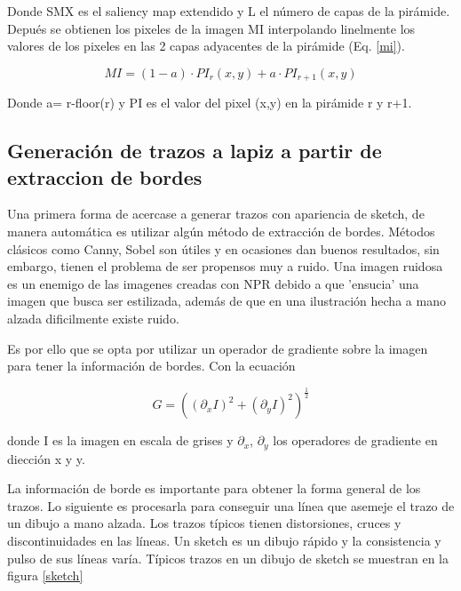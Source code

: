 \documentclass[letterpaper, 10 pt, conference]{ieeeconf}  %
\begin{document}
Donde SMX es el saliency map extendido y L el número de capas de la pirámide. Depués se obtienen los pixeles de la imagen MI interpolando linelmente los valores de los pixeles en las 2 capas adyacentes de la pirámide (Eq. \ref{mi}).

\begin{equation} \label{mi}
MI = (1-a)\cdot PI_{r}(x,y) +  a\cdot PI_{r+1}(x,y)
\end{equation}

Donde a= r-floor(r) y  PI es el valor del pixel (x,y) en la pirámide r y r+1.


\subsection{Generación de trazos a lapiz a partir de extraccion de bordes}
Una primera forma de acercase a generar trazos con apariencia de sketch, de manera automática es utilizar algún método de extracción de bordes. Métodos clásicos como Canny, Sobel son útiles y en ocasiones dan buenos resultados, sin embargo, tienen el problema de ser propensos muy a ruido. Una imagen ruidosa es un enemigo de las imagenes creadas con NPR debido a que 'ensucia' una imagen que busca ser estilizada, además de que en una ilustración hecha a mano alzada dificilmente existe ruido.

Es por ello que se opta por utilizar un operador de gradiente sobre la imagen para tener la información de bordes. Con la ecuación

\begin{equation} \label{grad}
G=((\partial_{x}I)^{2} + (\partial_{y}I)^{2} )^{\frac{1}{2}}
\end{equation}

donde I es la imagen en escala de grises y $\partial_{x}$, $\partial_{y}$ los operadores de gradiente en diección x y y.

La información de borde es importante para obtener la forma general de los trazos. Lo siguiente es procesarla para conseguir una línea que asemeje el trazo de un dibujo a mano alzada.
Los trazos típicos tienen distorsiones, cruces y discontinuidades en las líneas. Un sketch es un dibujo rápido y la consistencia y pulso de sus líneas varía. Típicos trazos en un dibujo de sketch se muestran en la figura \ref{sketch}
\end{document}
